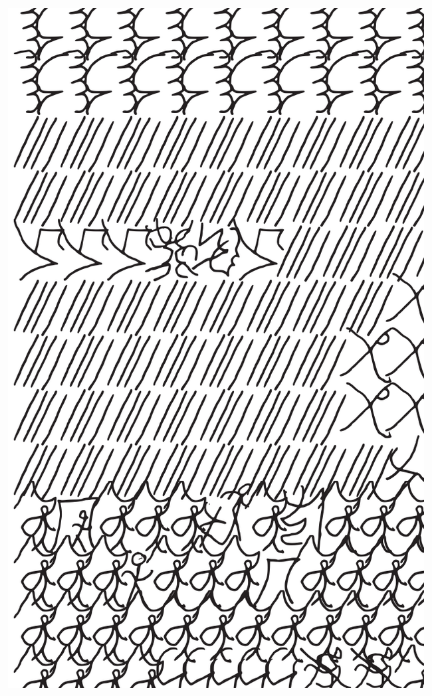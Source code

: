 \makeatletter\@openrightfalse
\movetooddpage
\begin{absolutelynopagebreak}
\begin{vplace}
\begin{figure}[H]
\begin{adjustwidth}{-0.99cm}{}
  \centering
  \vspace*{-1.77cm}
  \hspace*{-0.45cm}
  \includegraphics[width=110mm]{./imgs/img8.pdf}  
  \hfill
\end{adjustwidth}

\thispagestyle{empty}

\end{figure}
\end{vplace}

\end{absolutelynopagebreak}

